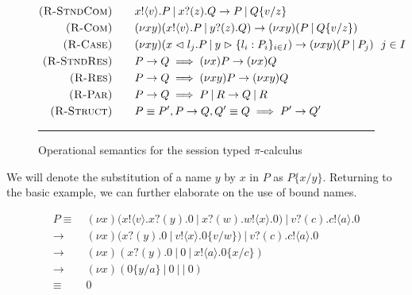 \begin{figure}[h]
    \centering
    \begin{align*}
        \begin{split}
            \textsc{(R-StndCom)} \hspace{20pt}& x!\langle v \rangle.P \: | \: x?(z).Q \rightarrow P \: | \: Q\{v/z\}\\
            \textsc{(R-Com)} \hspace{20pt}& (\nu xy)(x!\langle v \rangle.P \: | \: y?(z).Q) \rightarrow (\nu xy)(P \: | \: Q\{v/z\}) \\
            \textsc{(R-Case)} \hspace{20pt}& (\nu xy)(x \vartriangleleft l_j.P \: | \: y \vartriangleright \{ l_i : P_i \}_{i\in I}) \rightarrow (\nu xy)(P \: | \: P_j) \:\:\: j \in I \\
            \textsc{(R-StndRes)} \hspace{20pt}& P \rightarrow Q \implies (\nu x) P \rightarrow (\nu x) Q \\
            \textsc{(R-Res)} \hspace{20pt}& P \rightarrow Q \implies (\nu xy) P \rightarrow (\nu xy) Q \\
            \textsc{(R-Par)} \hspace{20pt}& P \rightarrow Q \implies P \: | \: R \rightarrow Q \: | \: R \\
            \textsc{(R-Struct)} \hspace{20pt}& P \equiv P', P \rightarrow Q, Q' \equiv Q \implies P' \rightarrow Q'
        \end{split}
    \end{align*}
    \noindent\rule{12cm}{0.8pt}
    \caption{Operational semantics for the session typed $\pi$-calculus}
    \label{fig:reductionSess}
\end{figure}

We will denote the substitution of a name $y$ by $x$ in $P$ as $P\{x/y\}$. Returning to the basic example, we can further elaborate on the use of bound names. 

\begin{equation*}
    \begin{split}
        P \equiv \:& (\nu x) (x!\langle v \rangle.x?(y).0 \:|\: x?(w).w!\langle x \rangle.0) \:|\: v?(c).c!\langle a \rangle.0 \\
        \rightarrow \:& (\nu x) (x?(y).0 \: | \: v!\langle x \rangle.0 \{v/w\}) \: | \: v?(c).c!\langle a \rangle.0 \\
        \rightarrow \:& (\nu x) (x?(y).0 \: | \: 0 \: | \: x!\langle a \rangle.0\{x/c\} ) \\
        \rightarrow \: & (\nu x) (0 \{y/a\} \: | \: 0 \: | \: | \:0 ) \\
        \equiv \: & 0
    \end{split}
\end{equation*}

